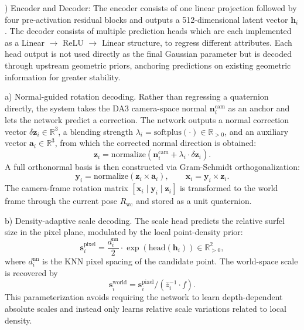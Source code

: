 \documentclass[letterpaper, 10pt, conference]{ieeeconf}
\begin{document}
\vspace{0.35em}
) Encoder and Decoder: The encoder consists of one linear projection followed by four pre-activation residual blocks and outputs a 512-dimensional latent vector $\mathbf{h}_i$. The decoder consists of multiple prediction heads which are each implemented as a Linear $\to$ ReLU $\to$ Linear structure, to regress different attributes. Each head output is not used directly as the final Gaussian parameter but is decoded through upstream geometric priors, anchoring predictions on existing geometric information for greater stability.

\vspace{0.25em}
\noindent a) Normal-guided rotation decoding. Rather than regressing a quaternion directly, the system takes the DA3 camera-space normal $\mathbf{n}_i^{\text{cam}}$ as an anchor and lets the network predict a correction. The network outputs a normal correction vector $\delta \mathbf{z}_i \in \mathbb{R}^3$, a blending strength $\lambda_i = \text{softplus}(\cdot) \in \mathbb{R}_{>0}$, and an auxiliary vector $\mathbf{a}_i \in \mathbb{R}^3$, from which the corrected normal direction is obtained:
%
\begin{equation}
\mathbf{z}_i = \text{normalize}(\mathbf{n}_i^{\text{cam}} + \lambda_i \cdot \delta \mathbf{z}_i).
\end{equation}
%
A full orthonormal basis is then constructed via Gram-Schmidt orthogonalization:
%
\begin{equation}
\mathbf{y}_i = \text{normalize}(\mathbf{z}_i \times \mathbf{a}_i), \qquad \mathbf{x}_i = \mathbf{y}_i \times \mathbf{z}_i.
\end{equation}
%
The camera-frame rotation matrix $[\mathbf{x}_i \mid \mathbf{y}_i \mid \mathbf{z}_i]$ is transformed to the world frame through the current pose $R_{\text{wc}}$ and stored as a unit quaternion.

\vspace{0.25em}
\noindent b) Density-adaptive scale decoding. The scale head predicts the relative surfel size in the pixel plane, modulated by the local point-density prior:
%
\begin{equation}
\mathbf{s}_i^{\text{pixel}} = \frac{d_i^{\text{nn}}}{2} \cdot \exp(\text{head}(\mathbf{h}_i)) \in \mathbb{R}^2_{>0},
\end{equation}
%
where $d_i^{\text{nn}}$ is the KNN pixel spacing of the candidate point. The world-space scale is recovered by
%
\begin{equation}
\mathbf{s}_i^{\text{world}} = \mathbf{s}_i^{\text{pixel}} / (\bar{z}_i^{-1} \cdot f).
\end{equation}
%
This parameterization avoids requiring the network to learn depth-dependent absolute scales and instead only learns relative scale variations related to local density.
\end{document}
